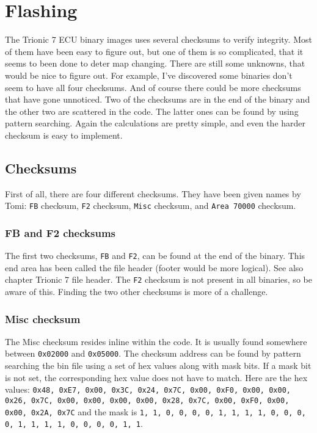 \documentclass[11pt,a4paper]{book}
\begin{document}
\chapter{Flashing}
The Trionic 7 ECU binary images uses several checksums to verify integrity. Most
of them have been easy to figure out, but one of them is so complicated, that it
seems to been done to deter map changing. There are still some unknowns, that
would be nice to figure out. For example, I've discovered some binaries don't
seem to have all four checksums. And of course there could be more checksums
that have gone unnoticed. Two of the checksums are in the end of the binary and
the other two are scattered in the code. The latter ones can be found by using
pattern searching. Again the calculations are pretty simple, and even the harder
checksum is easy to implement.

\section{Checksums}
First of all, there are four different checksums. They have been given names by
Tomi: \texttt{FB} checksum,
\texttt{F2} checksum,
\texttt{Misc} checksum, and \texttt{Area 70000}
checksum.

\subsection{FB and F2 checksums}\label{sec:FBF2Checksum}
The first two checksums, \texttt{FB} and \texttt{F2}, can be found at the end of
the binary. This end area has been called the file header (footer would be more
logical). See also chapter Trionic 7 file header. The
\texttt{F2} checksum is not present in all binaries, so be aware of this.
Finding the two other checksums is more of a challenge.

\subsection{Misc checksum}
The Misc checksum resides inline within the code. It is usually found somewhere
between \texttt{0x02000} and \texttt{0x05000}. The checksum address can be found
by pattern searching the bin file using a set of hex values along with mask
bits. If a mask bit is not set, the corresponding hex value does not have to
match. Here are the hex values: \texttt{0x48, 0xE7, 0x00, 0x3C, 0x24, 0x7C,
    0x00, 0xF0, 0x00, 0x00, 0x26, 0x7C, 0x00, 0x00, 0x00, 0x00, 0x28, 0x7C,
    0x00, 0xF0, 0x00, 0x00, 0x2A, 0x7C} and the mask is \texttt{1, 1, 0, 0, 0,
0, 1, 1, 1, 1, 0, 0, 0, 0, 1, 1, 1, 1, 0, 0, 0, 0, 1, 1}.
\end{document}
